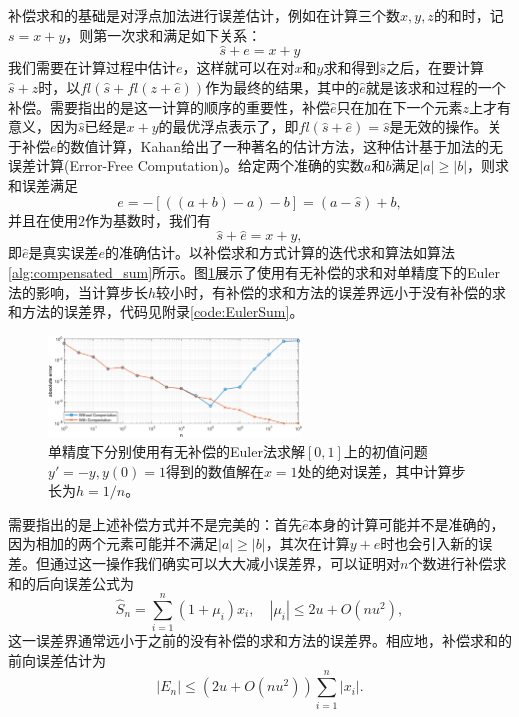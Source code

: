 \documentclass[a4paper,10pt]{ctexart}
\begin{document}
补偿求和的基础是对浮点加法进行误差估计，例如在计算三个数$ x,y,z $的和时，记$ s=x+y $，则第一次求和满足如下关系：
\[
    \hat{s} + e = x+y
\]
我们需要在计算过程中估计$ e $，这样就可以在对$ x $和$ y $求和得到$ \hat{s} $之后，在要计算$ \hat{s}+z $时，以$ fl(\hat{s} +fl(z+\hat{e})) $作为最终的结果，其中的$ \hat{e} $就是该求和过程的一个补偿。需要指出的是这一计算的顺序的重要性，补偿$ \hat{e} $只在加在下一个元素$ z $上才有意义，因为$ \hat{s} $已经是$ x+y $的最优浮点表示了，即$ fl(\hat{s} + \hat{e}) = \hat{s} $是无效的操作。关于补偿$ e $的数值计算，Kahan给出了一种著名的估计方法，这种估计基于加法的无误差计算(Error-Free Computation)。给定两个准确的实数$ a $和$ b $满足$ |a|\geqslant |b| $，则求和误差满足
\begin{equation}
    e = -[((a+b)-a)-b] = (a-\hat{s})+b,
\end{equation}
并且在使用$ 2 $作为基数时，我们有
\begin{equation}
    \hat{s} + \hat{e} = x + y, 
\end{equation}
即$ \hat{e} $是真实误差$ e $的准确估计。以补偿求和方式计算的迭代求和算法如算法\ref{alg:compensated_sum}所示。图\ref{fig:EulerSum}展示了使用有无补偿的求和对单精度下的Euler法的影响，当计算步长$ h $较小时，有补偿的求和方法的误差界远小于没有补偿的求和方法的误差界，代码见附录\ref{code:EulerSum}。

\begin{figure}[htpb]
    \centering
    \includegraphics[width=0.6\textwidth]{EulerSum.png}
    \caption{单精度下分别使用有无补偿的Euler法求解$ [0,1] $上的初值问题$ y' = -y, y(0)=1 $得到的数值解在$ x=1 $处的绝对误差，其中计算步长为$ h = 1 / n $。}
    \label{fig:EulerSum}
\end{figure}

需要指出的是上述补偿方式并不是完美的：首先$ \hat{e} $本身的计算可能并不是准确的，因为相加的两个元素可能并不满足$ |a|\geqslant |b| $，其次在计算$ y+e $时也会引入新的误差。但通过这一操作我们确实可以大大减小误差界，可以证明对$ n $个数进行补偿求和的后向误差公式为
\begin{equation}
    \hat{S}_n = \sum_{i=1}^n (1+\mu_i)x_i,\quad |\mu_i|\leqslant 2u + O(nu^2),
\end{equation}
这一误差界通常远小于之前的没有补偿的求和方法的误差界。相应地，补偿求和的前向误差估计为
\begin{equation}
    |E_n|\leqslant (2u + O(nu^2))\sum_{i=1}^n |x_i|.
\end{equation}
\end{document}
